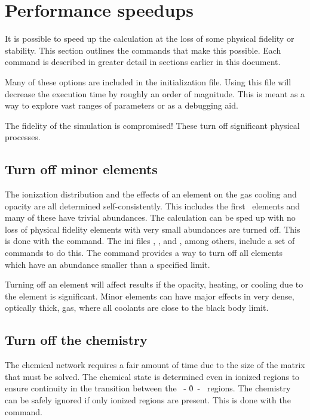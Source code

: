 \section{Performance speedups}

It is possible to speed up the calculation at the loss of some physical
fidelity or stability.
This section outlines the commands that make this
possible.
Each command is described in greater detail in sections earlier
in this document.

Many of these options are included in the
 initialization file.
Using this  file will decrease the execution time
by roughly an order of magnitude.
This is meant as a way to explore vast ranges of parameters
or as a debugging aid.

  The fidelity of the simulation is compromised!
These turn off significant physical processes.

\subsection{Turn off minor elements}

The ionization distribution and the effects of an element on the gas
cooling and opacity are all determined self-consistently.
This includes
the first \LIMELM\ elements and many of these have trivial abundances.
The
calculation can be sped up with no loss of physical fidelity elements with
very small abundances are turned off.
This is done with the
command.
The ini files ,
, and ,
among others,
include a set of  commands to do this.
The  command provides a way
to turn off all elements which have an
abundance smaller than a specified limit.

Turning off an element will affect results if the opacity,
heating, or cooling
due to the element is significant.
Minor elements can have major effects
in very dense, optically thick, gas, where all coolants are close to the
black body limit.

\subsection{Turn off the chemistry}

The chemical network requires a fair amount of time due to the size of
the matrix that must be solved.
The chemical state is determined even in
ionized regions to ensure continuity in the transition
between the \hplus\ - \h0\ - \htwo\ regions.
The chemistry can be safely ignored if only ionized regions
are present.
This is done with the  command.

